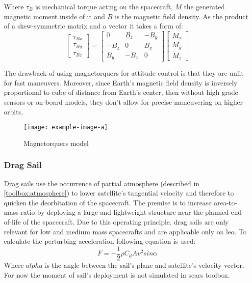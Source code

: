         Where $\tau_B$ is mechanical torque acting on the spacecraft, $M$ the generated magnetic moment inside of it and $B$ is the magnetic field density. As the product of a skew-symmetric matrix and a vector it takes a form of:
        \begin{equation}
            \begin{bmatrix}
            \tau_{Bx}\\ 
            \tau_{By}\\ 
            \tau_{Bz}
            \end{bmatrix}
            =
            \begin{bmatrix}
            0 & B_z & -B_y\\ 
            -B_z & 0 & B_x\\ 
            B_y & -B_x & 0
            \end{bmatrix}
            \begin{bmatrix}
            M_x\\
            M_y\\
            M_z
            \end{bmatrix}                
        \end{equation} %



        The drawback of using magnetorquers for attitude control is that they are unfit for fast maneuvers. Moreover, since Earth's magnetic field density is inversely proportional to cube of distance from Earth's center, then without high grade sensors or on-board models, they don't allow for precise maneuvering on higher orbits.

        \begin{figure}[H]
            \centering
            \texttt{[image: example-image-a]}
            \caption{Magnetorquers model}
            \label{fig:mag_simulink}
        \end{figure}


    \subsubsection{Drag Sail}
        Drag sails use the occurrence of partial atmosphere (described in \ref{toolbox:atmosphere}) to lower satellite's tangential velocity and therefore to quicken the deorbitation of the spacecraft. The premise is to increase area-to-mass-ratio by deploying a large and lightweight structure near the planned end-of-life of the spacecraft. Due to this operating principle, drag sails are only relevant for low and medium mass spacecrafts and are applicable only on \ac{leo}. To calculate the perturbing acceleration following equation is used:
        \begin{equation}
            F = -\frac{1}{2}\rho C_d A v^2sin\alpha
        \end{equation}
        Where $alpha$ is the angle between the sail's plane and satellite's velocity vector. For now the moment of sail's deployment is not simulated in \ac{scars} toolbox.

